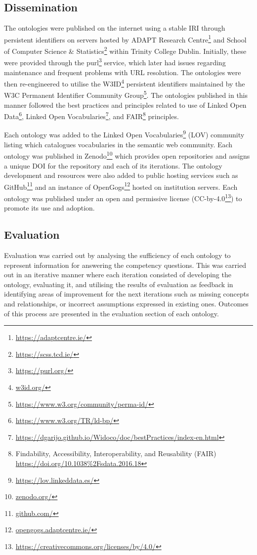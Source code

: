 \subsection{Dissemination}
The ontologies were published on the internet using a stable IRI through persistent identifiers on servers hosted by ADAPT Research Centre\footnote{\url{https://adaptcentre.ie/}} and School of Computer Science \& Statistics\footnote{\url{https://scss.tcd.ie/}} within Trinity College Dublin. Initially, these were provided through the purl\footnote{\url{https://purl.org/}} service, which later had issues regarding maintenance and frequent problems with URL resolution. The ontologies were then re-engineered to utilise the W3ID\footnote{\url{w3id.org/}} persistent identifiers maintained by the W3C Permanent Identifier Community Group\footnote{\url{https://www.w3.org/community/perma-id/}}. The ontologies published in this manner followed the best practices and principles related to use of Linked Open Data\footnote{\url{https://www.w3.org/TR/ld-bp/}}, Linked Open Vocabularies\footnote{\url{https://dgarijo.github.io/Widoco/doc/bestPractices/index-en.html}}, and FAIR\footnote{Findability, Accessibility, Interoperability, and Reusability (FAIR) \url{https://doi.org/10.1038\%2Fsdata.2016.18}} principles.

Each ontology was added to the Linked Open Vocabularies\footnote{\url{https://lov.linkeddata.es/}} (LOV) community listing which catalogues vocabularies in the semantic web community. Each ontology was published in Zenodo\footnote{\url{zenodo.org/}} which provides open repositories and assigns a unique DOI for the repository and each of its iterations. The ontology development and resources were also added to public hosting services such as GitHub\footnote{\url{github.com/}} and an instance of OpenGogs\footnote{\url{opengogs.adaptcentre.ie/}} hosted on institution servers. Each ontology was published under an open and permissive license (CC-by-4.0\footnote{\url{https://creativecommons.org/licenses/by/4.0/}}) to promote its use and adoption.

\subsection{Evaluation}
Evaluation was carried out by analysing the sufficiency of each ontology to represent information for answering the competency questions. This was carried out in an iterative manner where each iteration consisted of developing the ontology, evaluating it, and utilising the results of evaluation as feedback in identifying areas of improvement for the next iterations such as missing concepts and relationships, or incorrect assumptions expressed in existing ones. Outcomes of this process are presented in the evaluation section of each ontology.

